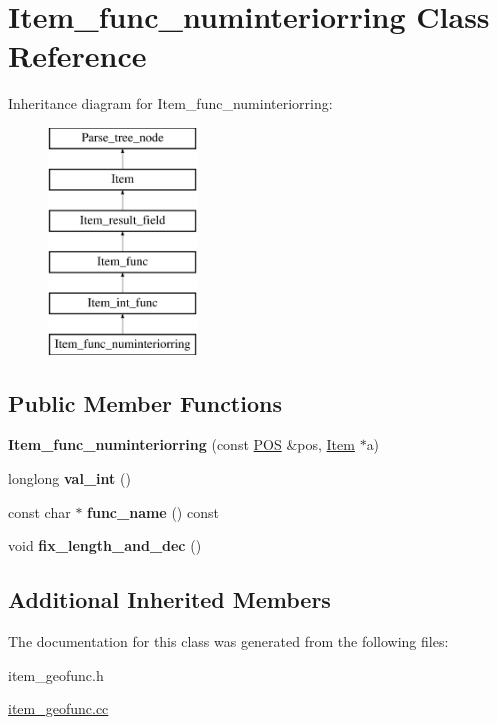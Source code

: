 \hypertarget{classItem__func__numinteriorring}{}\section{Item\+\_\+func\+\_\+numinteriorring Class Reference}
\label{classItem__func__numinteriorring}
Inheritance diagram for Item\+\_\+func\+\_\+numinteriorring\+:\begin{figure}[H]
\begin{center}
\leavevmode
\includegraphics[height=6.000000cm]{classItem__func__numinteriorring}
\end{center}
\end{figure}
\subsection*{Public Member Functions}
\begin{DoxyCompactItemize}
\item 
\mbox{\label{classItem__func__numinteriorring_a8ca2b8bec9c2ec350cbdddbd8fa3a139}} 
{\bfseries Item\+\_\+func\+\_\+numinteriorring} (const \mbox{\hyperlink{structYYLTYPE}{P\+OS}} \&pos, \mbox{\hyperlink{classItem}{Item}} $\ast$a)
\item 
\mbox{\label{classItem__func__numinteriorring_aa21ac3958715f4208f5704b4645d55dd}} 
longlong {\bfseries val\+\_\+int} ()
\item 
\mbox{\label{classItem__func__numinteriorring_a1000efeb3d13535d990d80107b11715d}} 
const char $\ast$ {\bfseries func\+\_\+name} () const
\item 
\mbox{\label{classItem__func__numinteriorring_ac3f673164ab65c698e58e041e8195ec3}} 
void {\bfseries fix\+\_\+length\+\_\+and\+\_\+dec} ()
\end{DoxyCompactItemize}
\subsection*{Additional Inherited Members}


The documentation for this class was generated from the following files\+:\begin{DoxyCompactItemize}
\item 
item\+\_\+geofunc.\+h\item 
\mbox{\hyperlink{item__geofunc_8cc}{item\+\_\+geofunc.\+cc}}\end{DoxyCompactItemize}
